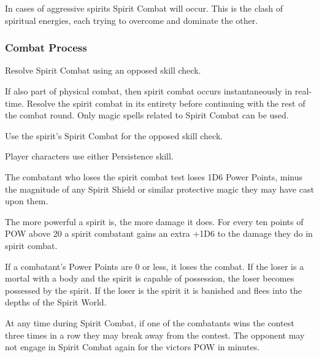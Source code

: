 In cases of aggressive spirits Spirit Combat will occur. This is the clash of spiritual energies, each trying to overcome and dominate the other.

\subsubsection{Combat Process}
\begin{rpg-list}
\item Resolve Spirit Combat using an opposed skill check.
\item If also part of physical combat, then spirit combat occurs instantaneously in real-time. Resolve the spirit combat in its entirety before continuing with the rest of the combat round. Only magic spells related to Spirit Combat can be used.
\item Use the spirit's Spirit Combat for the opposed skill check.
\item Player characters use either Persistence skill. %
\item The combatant who loses the spirit combat test loses 1D6 Power Points, minus the magnitude of any Spirit Shield or similar protective magic they may have cast upon them.
\item The more powerful a spirit is, the more damage it does. For every ten points of POW above 20 a spirit combatant gains an extra +1D6 to the damage they do in spirit combat.
\item If a combatant’s Power Points are 0 or less, it loses the combat. If the loser is a mortal with a body and the spirit is capable of possession, the loser becomes possessed by the spirit. If the loser is the spirit it is banished and flees into the depths of the Spirit World. 
\item At any time during Spirit Combat, if one of the combatants wins the contest three times in a row they may break away from the contest. The opponent may not engage in Spirit Combat again for the victors POW in minutes.
\end{rpg-list}


